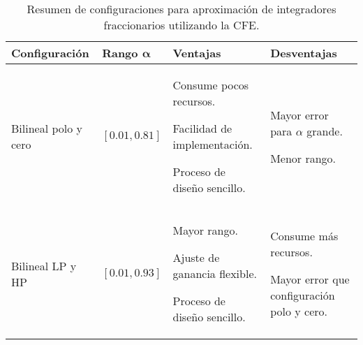 	\begin{table}[!ht]
	  \centering
	  \caption{Resumen de configuraciones para aproximación de integradores fraccionarios utilizando la CFE.}
	  \label{tab:resumen_config}
	  \begin{tabular}{>{\centering\arraybackslash}m{3.5cm} >{\centering\arraybackslash}m{2.5cm} >{\centering\arraybackslash}m{4cm} >{\centering\arraybackslash}m{4cm}}
	    \hline
	    \textbf{Configuración} & \textbf{Rango} $\bm{\alpha}$ & \textbf{Ventajas}  & \textbf{Desventajas}\\ 
	    \hline
	      Bilineal polo y cero
	    &
	     $[0.01, 0.81]$
	    & 
	      \begin{itemize}[leftmargin=0cm,noitemsep]
	      \begin{scriptsize}
			\item[] Consume pocos recursos.
			\item[] Facilidad de implementación.
			\item[] Proceso de diseño sencillo.
	      \end{scriptsize}
	      \end{itemize}
	     & 
	      \begin{itemize}[leftmargin=0cm,noitemsep]
	      \begin{scriptsize}
			\item[] Mayor error para $\alpha$ grande.
			\item[] Menor rango.
	      \end{scriptsize}
	      \end{itemize}
	    \\ %
	      Bilineal LP y HP
	    &
	      $[0.01, 0.93]$
	    & 
	      \begin{itemize}[leftmargin=0cm,noitemsep]
	      \begin{scriptsize}
			\item[] Mayor rango.
			\item[] Ajuste de ganancia flexible.
			\item[] Proceso de diseño sencillo.
	      \end{scriptsize}
	      \end{itemize}
	     & 
	      \begin{itemize}[leftmargin=0cm,noitemsep]
	      \begin{scriptsize}
			\item[] Consume más recursos.
			\item[] Mayor error que configuración polo y cero.

\end{scriptsize}
\end{itemize}
\end{tabular}
\end{table}
